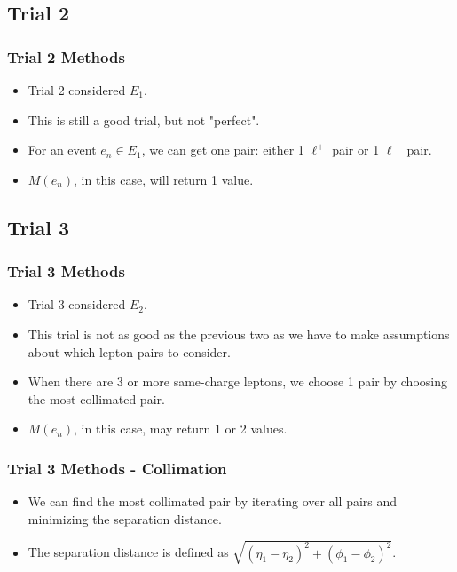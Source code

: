 \documentclass{beamer}
\begin{document}
\subsection{Trial 2}
\begin{frame}
\frametitle{Trial 2 Methods}
\begin{itemize}
\item<1-> Trial 2 considered $E_1$.
\item<2-> This is still a good trial, but not "perfect".
\item<3-> For an event $e_n\in E_1$, we can get one pair: either 1 $\ell^+$ pair or 1 $\ell^-$ pair.
\item<4-> $M(e_n)$, in this case, will return 1 value.
\end{itemize}
\end{frame}

\subsection{Trial 3}
\begin{frame}
\frametitle{Trial 3 Methods}
\begin{itemize}
\item<1-> Trial 3 considered $E_2$.
\item<2-> This trial is not as good as the previous two as we have to make assumptions about which lepton pairs to consider.
\item<3-> When there are 3 or more same-charge leptons, we choose 1 pair by choosing the most collimated pair\footnotemark.
\item<4-> $M(e_n)$, in this case, may return 1 or 2 values.
\end{itemize}
\end{frame}

\begin{frame}
\frametitle{Trial 3 Methods - Collimation}
\begin{itemize}
\item<1-> We can find the most collimated pair by iterating over all pairs and minimizing the separation distance.
\item<2-> The separation distance is defined as $\sqrt{(\eta_1-\eta_2)^2+(\phi_1-\phi_2)^2}$.
\end{itemize}
\end{frame}
\end{document}
